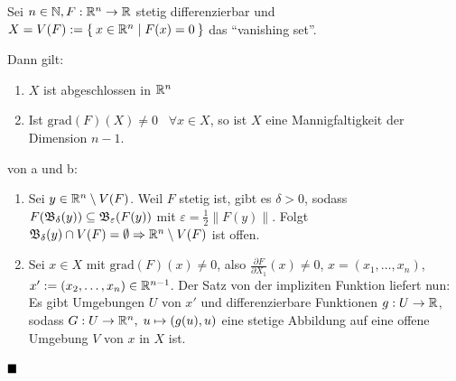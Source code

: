 \begin{korollar}
    Sei $n \in \mathbb{N}, F:\mathbb{R}^n \rightarrow \mathbb{R}$ stetig differenzierbar
    und $X = V(F) := \Set{x \in \ensuremath{\mathbb{R}}^n | F(x) = 0}$ das \enquote{vanishing set}.

    Dann gilt:
    \begin{enumerate}[label=\alph*),ref=\theplaindefinition.\alph*]
        \item $X$ ist abgeschlossen in $\mathbb{R}^n$
        \item Ist $\text{grad}(F)(X) \neq 0 \;\;\;\forall{x \in X}$, so ist
              $X$ eine Mannigfaltigkeit der Dimension $n-1$.  \label{Mannigfaltigkeitskriterium}
    \end{enumerate}
\end{korollar}

\begin{beweis}
    von a und b:
    \begin{enumerate}[label=\alph*),ref=\theplaindefinition.\alph*]
        \item Sei $y \in \mathbb{R}^n \setminus V(F)$. Weil $F$ stetig ist,
              gibt es $\delta > 0$, sodass $F(\mathfrak{B}_\delta(y)) \subseteq \mathfrak{B}_\varepsilon(F(y))$
              mit $\varepsilon = \frac{1}{2} \|F(y)\|$. Folgt
              $\mathfrak{B}_\delta(y) \cap V(F) = \emptyset \Rightarrow \mathbb{R}^n \setminus V(F)$
              ist offen.
        \item Sei $x \in X$ mit $\text{grad}(F)(x) \neq 0$, also
              \obda $\frac{\partial F}{\partial X_1} (x) \neq 0$,
              $x = (x_1, \dots, x_n)$, $x' := (x_2, \dots, x_n) \in \mathbb{R}^{n-1}$.
              Der Satz von der impliziten Funktion liefert nun:
              Es gibt Umgebungen $U$ von $x'$ und differenzierbare
              Funktionen $g: U \rightarrow \mathbb{R}$, sodass
              $G: U \rightarrow \mathbb{R}^n, \; u \mapsto (g(u), u)$
              eine stetige Abbildung auf eine offene Umgebung $V$ von
              $x$ in $X$ ist.
    \end{enumerate}  
    $\qed$
\end{beweis}

